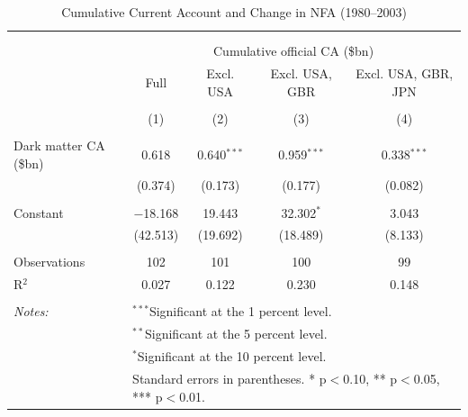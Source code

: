 \documentclass[11pt]{article}
\begin{document}
\small
\setcounter{table}{0}

\begin{table}[!htbp] \centering 
  \caption{Cumulative Current Account and Change in NFA (1980--2003)} 
  \label{tab:table1} 
\begin{tabular}{@{\extracolsep{5pt}}lcccc} 
\\[-1.8ex]\hline 
\hline \\[-1.8ex] 
\\[-1.8ex] & \multicolumn{4}{c}{Cumulative official CA (\$bn)} \\ 
 & Full & Excl. USA & Excl. USA, GBR & Excl. USA, GBR, JPN \\ 
\\[-1.8ex] & (1) & (2) & (3) & (4)\\ 
\hline \\[-1.8ex] 
 Dark matter CA (\$bn) & 0.618 & 0.640$^{***}$ & 0.959$^{***}$ & 0.338$^{***}$ \\ 
  & (0.374) & (0.173) & (0.177) & (0.082) \\ 
  & & & & \\ 
 Constant & $-$18.168 & 19.443 & 32.302$^{*}$ & 3.043 \\ 
  & (42.513) & (19.692) & (18.489) & (8.133) \\ 
  & & & & \\ 
Observations & 102 & 101 & 100 & 99 \\ 
R$^{2}$ & 0.027 & 0.122 & 0.230 & 0.148 \\ 
\hline \\[-1.8ex] 
\textit{Notes:} & \multicolumn{4}{l}{$^{***}$Significant at the 1 percent level.} \\ 
 & \multicolumn{4}{l}{$^{**}$Significant at the 5 percent level.} \\ 
 & \multicolumn{4}{l}{$^{*}$Significant at the 10 percent level.} \\ 
 & \multicolumn{4}{l}{Standard errors in parentheses. * p$<$0.10, ** p$<$0.05, *** p$<$0.01.} \\ 
\end{tabular} 
\end{table} 
\end{document}
